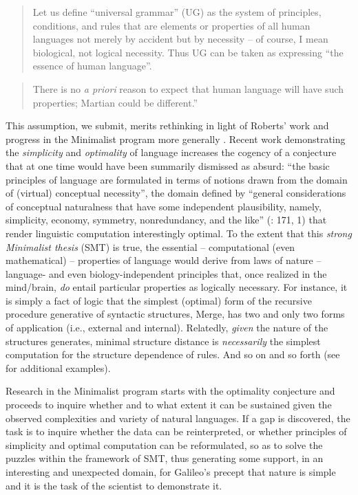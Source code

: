 \documentclass[output=paper]{langsci/langscibook}
\begin{document}
\begin{quote}Let us define ``universal grammar'' (\gls{UG}) as the system of
principles, conditions, and rules that are elements or properties of all human
languages not merely by accident but by necessity – of course, I mean
biological, not logical necessity. Thus \gls{UG} can be taken as expressing
\enquote{the essence of human language}.\hfill\citep[29]{Chomsky1975}
\end{quote}

\begin{quote}There is no \emph{a priori} reason to expect that human language will
have such properties; Martian could be different.”\hfill\citep[16]{Chomsky2000}
\end{quote}

This assumption, we submit, merits rethinking in light of Roberts’ work and
progress in the Minimalist program more generally \citep{Chomsky1995}. Recent
work demonstrating the \emph{simplicity} \parencite{WatChoRob2017} and
\emph{optimality} \citep{ChoGalOtt2019} of language increases the cogency of
a conjecture that at one time would have been summarily dismissed as absurd:
“the basic principles of language are formulated in terms of notions drawn from
the domain of (virtual) conceptual necessity”, the domain defined by “general
considerations of conceptual naturalness that have some independent
plausibility, namely, simplicity, economy, symmetry, nonredundancy, and the
like” (\citealt{Chomsky1995}: 171, 1) that render linguistic computation
interestingly optimal. To the extent that this \emph{strong Minimalist thesis}
(\gls{SMT}) is true,
the essential – computational (even mathematical) – properties of language
would derive from laws of nature – language- and even biology-independent
principles that, once realized in the mind/brain, \emph{do} entail particular
properties as logically necessary. For instance, it is simply a fact of logic
that the simplest (optimal) form of the recursive procedure generative of
syntactic structures, Merge, has two and only two forms of application (i.e.,
external and internal).  Relatedly, \emph{given} the nature of the structures
 generates, minimal structure distance is \emph{necessarily} the
simplest computation for the structure dependence of rules. And so on and so
forth (see \citealt{BerwickEtAl2011,Chomsky2013,Watumull2015} for additional
examples).

Research in the Minimalist program starts with the optimality conjecture and
proceeds to inquire whether and to what extent it can be sustained given the
observed complexities and variety of natural languages. If a gap is discovered,
the task is to inquire whether the data can be reinterpreted, or whether
principles of simplicity and optimal computation can be reformulated, so as to
solve the puzzles within the framework of \gls{SMT}, thus generating some support, in
an interesting and unexpected domain, for Galileo’s precept that nature is
simple and it is the task of the scientist to demonstrate it.
\end{document}
